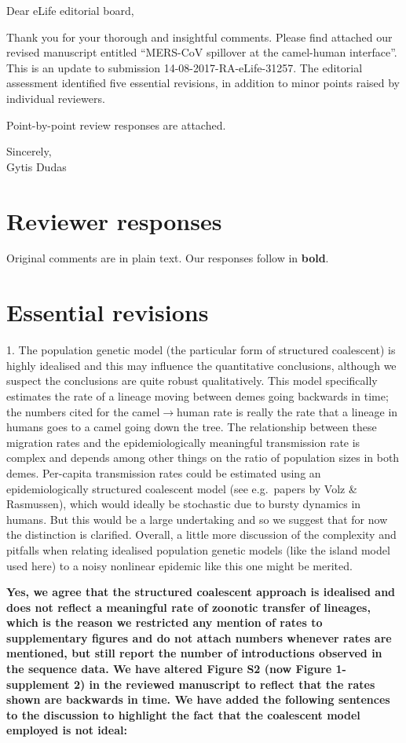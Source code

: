 \documentclass[11pt,oneside,letterpaper]{article}
\begin{document}

Dear eLife editorial board,

Thank you for your thorough and insightful comments. Please find attached our revised manuscript entitled ``MERS-CoV spillover at the camel-human interface''.  This is an update to submission 14-08-2017-RA-eLife-31257. The editorial assessment identified five essential revisions, in addition to minor points raised by individual reviewers.

Point-by-point review responses are attached.

Sincerely,\\
Gytis Dudas

\newpage

\section*{Reviewer responses}

Original comments are in plain text.  Our responses follow in \textbf{bold}.

\section*{Essential revisions}
1. The population genetic model (the particular form of structured coalescent) is highly idealised and this may influence the quantitative conclusions, although we suspect the conclusions are quite robust qualitatively. This model specifically estimates the rate of a lineage moving between demes going backwards in time; the numbers cited for the camel$\rightarrow$human rate is really the rate that a lineage in humans goes to a camel going down the tree. The relationship between these migration rates and the epidemiologically meaningful transmission rate is complex and depends among other things on the ratio of population sizes in both demes. Per-capita transmission rates could be estimated using an epidemiologically structured coalescent model (see e.g.\ papers by Volz \& Rasmussen), which would ideally be stochastic due to bursty dynamics in humans. But this would be a large undertaking and so we suggest that for now the distinction is clarified. Overall, a little more discussion of the complexity and pitfalls when relating idealised population genetic models (like the island model used here) to a noisy nonlinear epidemic like this one might be merited.

\textbf{Yes, we agree that the structured coalescent approach is idealised and does not reflect a meaningful rate of zoonotic transfer of lineages, which is the reason we restricted any mention of rates to supplementary figures and do not attach numbers whenever rates are mentioned, but still report the number of introductions observed in the sequence data. We have altered Figure S2 (now Figure 1-supplement 2) in the reviewed manuscript to reflect that the rates shown are backwards in time. We have added the following sentences to the discussion to highlight the fact that the coalescent model employed is not ideal:}
\end{document}
